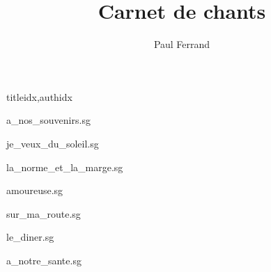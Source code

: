 \documentclass[
    fontsize=7pt
    ]{scrartcl}
\title{Carnet de chants}
\author{Paul Ferrand}
\newcommand{\phantomsection}{}
\begin{document}
\maketitle

% 
\newpage


\ifdiagrampage
   \phantomsection
   \chords
\fi
\setcounter{songnum}{1}%

\phantomsection
{}

\begin{songs}{titleidx,authidx}

{a_nos_souvenirs.sg}


{je_veux_du_soleil.sg}


{la_norme_et_la_marge.sg}


{amoureuse.sg}


{sur_ma_route.sg}


{le_diner.sg}


{a_notre_sante.sg}


\end{songs}
\end{document}
